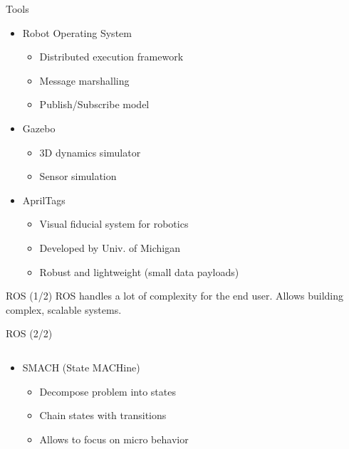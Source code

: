 \documentclass[]{beamer}
\begin{document}
\begin{frame}{Tools}
    \begin{itemize}
        \item Robot Operating System
            \begin{itemize}
                \item Distributed execution framework
                \item Message marshalling
                \item Publish/Subscribe model
            \end{itemize}
        \item Gazebo
            \begin{itemize}
                \item 3D dynamics simulator
                \item Sensor simulation
            \end{itemize}
        \item AprilTags
            \begin{itemize}
                \item Visual fiducial system for robotics
                \item Developed by Univ. of Michigan
                \item Robust and lightweight (small data payloads)
            \end{itemize}
    \end{itemize}
\end{frame}

\begin{frame}{ROS (1/2)}
    \centering
    \vspace{2em}
    ROS handles a lot of complexity for the end user. Allows building complex, scalable systems.
\end{frame}

\begin{frame}{ROS (2/2)}
    \begin{columns}
        \begin{column}{0.3\textwidth}
            \begin{itemize}
                \item SMACH (State MACHine)
                    \begin{itemize}
                        \item Decompose problem into states
                        \item Chain states with transitions
                        \item Allows to focus on micro behavior
                    \end{itemize}
            \end{itemize}
        \end{column}
        \begin{column}{0.7\textwidth}
        \end{column}
    \end{columns}
\end{frame}
\end{document}
